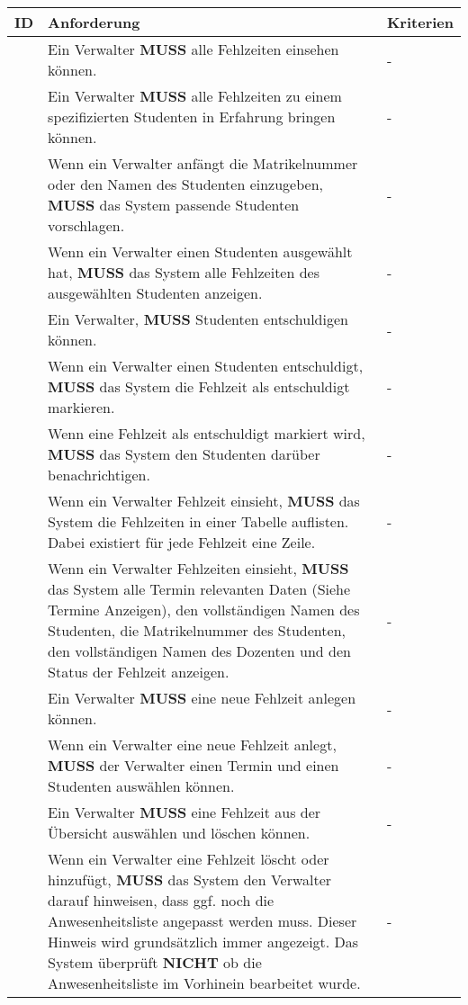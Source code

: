 \begin{tabular} {|p{}|p{}|p{}|}
	\hline
	ID & Anforderung & Kriterien \\
	\hline
	\printfreqnr
	& Ein Verwalter \textbf{MUSS} alle Fehlzeiten einsehen können. 
	& - \\
	\hline
	\printfreqnr
	& Ein Verwalter \textbf{MUSS} alle Fehlzeiten zu einem spezifizierten Studenten in Erfahrung bringen können.
	& - \\ 
	\hline
	\printfreqnr
	& Wenn ein Verwalter anfängt die Matrikelnummer oder den Namen des Studenten einzugeben, \textbf{MUSS} das System passende Studenten vorschlagen.
	& - \\ 
	\hline
	\printfreqnr
	& Wenn ein Verwalter einen Studenten ausgewählt hat, \textbf{MUSS} das System alle Fehlzeiten des ausgewählten Studenten anzeigen.
	& - \\ 
	\hline
	\printfreqnr
	& Ein Verwalter, \textbf{MUSS} Studenten entschuldigen können.
	& - \\ 
	\hline
	\printfreqnr
	& Wenn ein Verwalter einen Studenten entschuldigt, \textbf{MUSS} das System die Fehlzeit als entschuldigt markieren.
	& - \\ 
	\hline
	\printfreqnr
	& Wenn eine Fehlzeit als entschuldigt markiert wird, \textbf{MUSS} das System den Studenten darüber benachrichtigen.
	& - \\ 
	\hline
	\printfreqnr
	& Wenn ein Verwalter Fehlzeit einsieht, \textbf{MUSS} das System die Fehlzeiten in einer Tabelle auflisten. Dabei existiert für jede Fehlzeit eine Zeile.
	& - \\ 
	\hline
	\printfreqnr
	& Wenn ein Verwalter Fehlzeiten einsieht, \textbf{MUSS} das System alle Termin relevanten Daten (Siehe Termine Anzeigen), den vollständigen Namen des Studenten, die Matrikelnummer des Studenten, den vollständigen Namen des Dozenten und den Status der Fehlzeit anzeigen.
	& - \\ 
	\hline
	\printfreqnr
	& Ein Verwalter \textbf{MUSS} eine neue Fehlzeit anlegen können. 
	& - \\ 
	\hline
	\printfreqnr
	& Wenn ein Verwalter eine neue Fehlzeit anlegt, \textbf{MUSS} der Verwalter einen Termin und einen Studenten auswählen können. 
	& - \\ 
	\hline
	\printfreqnr
	& Ein Verwalter \textbf{MUSS} eine Fehlzeit aus der Übersicht auswählen und löschen können. 
	& - \\ 
	\hline
	\printfreqnr
	& Wenn ein Verwalter eine Fehlzeit löscht oder hinzufügt, \textbf{MUSS} das System den Verwalter darauf hinweisen, dass ggf. noch die Anwesenheitsliste angepasst werden muss. Dieser Hinweis wird grundsätzlich immer angezeigt. Das System überprüft \textbf{NICHT} ob die Anwesenheitsliste im Vorhinein bearbeitet wurde.
	& - \\ 
	\hline
\end{tabular}

